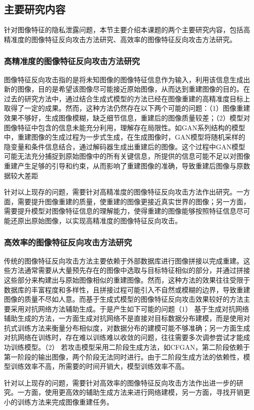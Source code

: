 \subsection{主要研究内容}
针对图像特征的隐私泄露问题，本节主要介绍本课题的两个主要研究内容，包括高精准度的图像特征反向攻击方法研究、高效率的图像特征反向攻击方法研究。
\subsubsection{高精准度的图像特征反向攻击方法研究}
图像特征反向攻击指的是将未知图像的图像特征信息作为输入，利用该信息生成出新的图像，目的是希望该图像尽可能接近原始图像，从而达到重建图像的目的。在过去的研究方法中，通过结合生成式模型的方法已经在图像重建的高精准度目标上取得了一定的成果。然而，这种方法仍然存在以下两个可能的问题：（1）图像重建效果不够好，生成图像模糊，缺乏细节信息，重建后的图像质量较差；（2）模型对图像特征中包含的信息未能充分利用，理解存在局限性。如GAN系列结构的模型中，重建图像的生成过程为一步式生成，在生成图像时，GAN模型将随机采样的隐变量和条件信息结合，通过解码器生成出重建后的图像。这个过程中GAN模型可能无法充分捕捉到原始图像中的所有关键信息，所提供的信息可能不足以对图像重建产生足够的引导和约束，从而影响了重建图像的准确，导致重建后图像与原数据较大差距
\par
针对以上现存的问题，需要针对高精准度的图像特征反向攻击方法作出研究。一方面，需要提升图像重建的质量，使重建的图像更接近真实世界的图像；另一方面，需要提升模型对图像特征信息的理解能力，使得重建的图像能够按照特征信息尽可能还原出原始图像，以实现高精准度的图像特征反向攻击。

\subsubsection{高效率的图像特征反向攻击方法研究}
传统的图像特征反向攻击方法主要依赖于外部数据库进行图像拼接以完成重建。这些方法通常需要从大量预先存在的图像中选取与目标特征相似的部分，‌并通过拼接这些部分来构建出与原始图像相似的重建图像。然而，‌这种方法的效果往往受限于数据库的丰富程度和多样性，‌且拼接过程可能引入不自然或模糊的边界，‌导致重建图像的质量不尽如人意。而基于生成式模型的图像特征反向攻击效果较好的方法主要采用对抗网络方法辅助生成。于是产生如下可能的问题（1） 基于生成对抗网络辅助生成的方法，一方面生成对抗网络不是直接对目标数据分布建模，而是使用对抗式训练方法来衡量分布相似度，对数据分布的建模可能不够准确；另一方面生成对抗网络在训练时，存在难以训练难以收敛的问题，往往需要多次调参尝试才能成功训练模型。（2） 若攻击模型采用二阶段生成方法，如CFGAN，第二阶段依赖于第一阶段的输出图像，两个阶段无法同时进行。由于二阶段生成方法的依赖性，‌模型训练效率不高，所需要的时间开销大，模型训练效率不高。
\par
针对以上现存的问题，需要针对高效率的图像特征反向攻击方法作出进一步的研究。一方面，使用更高效的辅助生成方法来进行网络建模，另一方面，寻找开销更小的训练方法来完成图像重建任务。